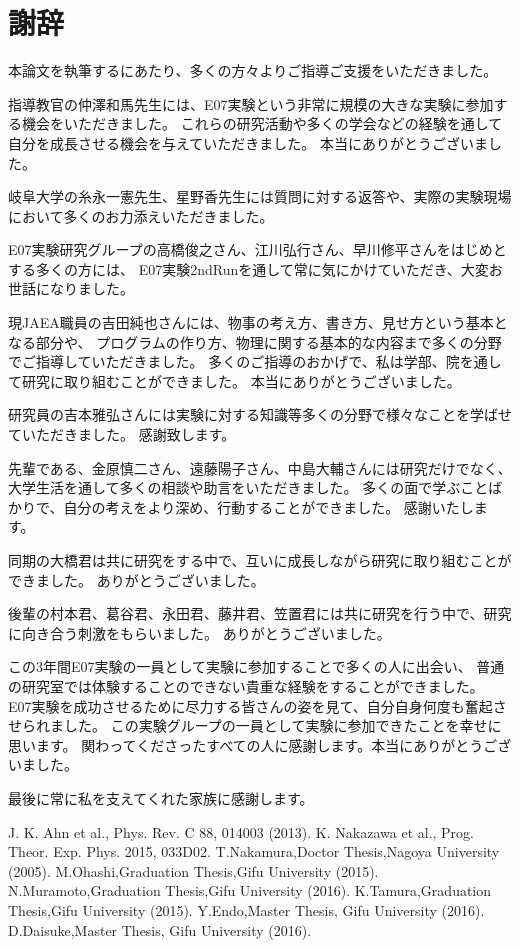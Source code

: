\documentclass[12pt,a4paper]{jarticle}
\begin{document}
\section*{謝辞}
本論文を執筆するにあたり、多くの方々よりご指導ご支援をいただきました。
\par
指導教官の仲澤和馬先生には、E07実験という非常に規模の大きな実験に参加する機会をいただきました。
これらの研究活動や多くの学会などの経験を通して自分を成長させる機会を与えていただきました。
本当にありがとうございました。
\par
岐阜大学の糸永一憲先生、星野香先生には質問に対する返答や、実際の実験現場において多くのお力添えいただきました。
\par
E07実験研究グループの高橋俊之さん、江川弘行さん、早川修平さんをはじめとする多くの方には、
E07実験2ndRunを通して常に気にかけていただき、大変お世話になりました。
\par
現JAEA職員の吉田純也さんには、物事の考え方、書き方、見せ方という基本となる部分や、
プログラムの作り方、物理に関する基本的な内容まで多くの分野でご指導していただきました。
多くのご指導のおかげで、私は学部、院を通して研究に取り組むことができました。
本当にありがとうございました。
\par
研究員の吉本雅弘さんには実験に対する知識等多くの分野で様々なことを学ばせていただきました。
感謝致します。
\par
先輩である、金原慎二さん、遠藤陽子さん、中島大輔さんには研究だけでなく、大学生活を通して多くの相談や助言をいただきました。
多くの面で学ぶことばかりで、自分の考えをより深め、行動することができました。
感謝いたします。
\par
同期の大橋君は共に研究をする中で、互いに成長しながら研究に取り組むことができました。
ありがとうございました。
\par
後輩の村本君、葛谷君、永田君、藤井君、笠置君には共に研究を行う中で、研究に向き合う刺激をもらいました。
ありがとうございました。
\par
この3年間E07実験の一員として実験に参加することで多くの人に出会い、
普通の研究室では体験することのできない貴重な経験をすることができました。
E07実験を成功させるために尽力する皆さんの姿を見て、自分自身何度も奮起させられました。
この実験グループの一員として実験に参加できたことを幸せに思います。
関わってくださったすべての人に感謝します。本当にありがとうございました。
\par
最後に常に私を支えてくれた家族に感謝します。
\newpage
\begin{thebibliography}{99}
 J. K. Ahn et al., Phys. Rev. C 88, 014003 (2013).
 K. Nakazawa et al., Prog. Theor. Exp. Phys. 2015, 033D02.
 T.Nakamura,Doctor Thesis,Nagoya University (2005).
 M.Ohashi,Graduation Thesis,Gifu University (2015).
 N.Muramoto,Graduation Thesis,Gifu University (2016).
 K.Tamura,Graduation Thesis,Gifu University (2015).
 Y.Endo,Master Thesis, Gifu University (2016).
 D.Daisuke,Master Thesis, Gifu University (2016).
\end{thebibliography}
\end{document}
